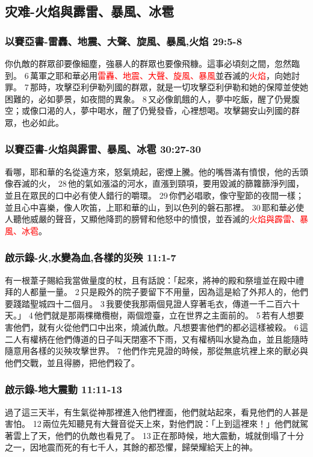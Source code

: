 \subsection{灾难-火焰與霹雷、暴風、冰雹}
\subsubsection{以賽亞書-雷轟、地震、大聲、旋風、暴風,火焰 29:5-8}
你仇敵的群眾卻要像細塵，強暴人的群眾也要像飛糠。這事必頃刻之間，忽然臨到。 6 萬軍之耶和華必用\textcolor{red}{雷轟、地震、大聲、旋風、暴風}並吞滅的\textcolor{red}{火焰}，向她討罪。 7 那時，攻擊亞利伊勒列國的群眾，就是一切攻擊亞利伊勒和她的保障並使她困難的，必如夢景，如夜間的異象。 8 又必像飢餓的人，夢中吃飯，醒了仍覺腹空；或像口渴的人，夢中喝水，醒了仍覺發昏，心裡想喝。攻擊錫安山列國的群眾，也必如此。

\subsubsection{以賽亞書-火焰與霹雷、暴風、冰雹 30:27-30}
看哪，耶和華的名從遠方來，怒氣燒起，密煙上騰。他的嘴唇滿有憤恨，他的舌頭像吞滅的火， 28 他的氣如漲溢的河水，直漲到頸項，要用毀滅的篩籮篩淨列國，並且在眾民的口中必有使人錯行的嚼環。 29 你們必唱歌，像守聖節的夜間一樣；並且心中喜樂，像人吹笛，上耶和華的山，到以色列的磐石那裡。 30 耶和華必使人聽他威嚴的聲音，又顯他降罰的膀臂和他怒中的憤恨，並吞滅的\textcolor{red}{火焰與霹雷、暴風、冰雹}。

\subsubsection{啟示錄-火,水變為血,各樣的災殃 11:1-7}
有一根葦子賜給我當做量度的杖，且有話說：「起來，將神的殿和祭壇並在殿中禮拜的人都量一量。 2 只是殿外的院子要留下不用量，因為這是給了外邦人的，他們要踐踏聖城四十二個月。 3 我要使我那兩個見證人穿著毛衣，傳道一千二百六十天。」 4 他們就是那兩棵橄欖樹，兩個燈臺，立在世界之主面前的。 5 若有人想要害他們，就有火從他們口中出來，燒滅仇敵。凡想要害他們的都必這樣被殺。 6 這二人有權柄在他們傳道的日子叫天閉塞不下雨，又有權柄叫水變為血，並且能隨時隨意用各樣的災殃攻擊世界。 7 他們作完見證的時候，那從無底坑裡上來的獸必與他們交戰，並且得勝，把他們殺了。


\subsubsection{啟示錄-地大震動 11:11-13}
過了這三天半，有生氣從神那裡進入他們裡面，他們就站起來，看見他們的人甚是害怕。 12 兩位先知聽見有大聲音從天上來，對他們說：「上到這裡來！」他們就駕著雲上了天，他們的仇敵也看見了。 13 正在那時候，地大震動，城就倒塌了十分之一，因地震而死的有七千人，其餘的都恐懼，歸榮耀給天上的神。

